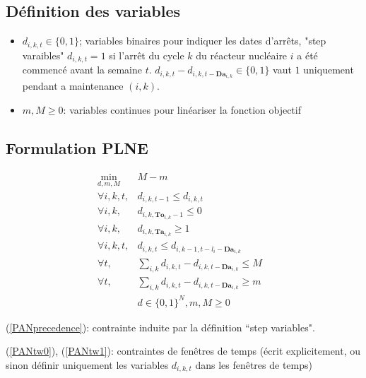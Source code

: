 \documentclass[a4paper,11pt]{article}
\begin{document}

    \subsection{Définition des variables}

    \begin{itemize}
     \item $d_{i,k,t}\in \{0,1\}$; variables binaires pour indiquer les dates d'arrêts, "step varaibles" 
    $d_{i,k,t}=1$ si l'arrêt du cycle $k$ du réacteur nucléaire $i$ a été commencé avant la semaine $t$.
    $d_{i,k,t}-d_{i,k,t- {\mathbf{Da}_{i,k}}} \in \{0,1\}$ vaut $1$ uniquement pendant a maintenance $(i,k)$.


     \item $m,M\geqslant 0$: variables continues pour linéariser la fonction objectif
    \end{itemize}


    \subsection{Formulation PLNE}


    \begin{eqnarray}
    \displaystyle \min_{d,m,M} & M-m
     & \\
    \forall i , k, t, & d_{i,k,t-1}\leqslant d_{i,k,t} & \label{PANprecedence}\\
    \forall i , k, & d_{i,k,\mathbf{To}_{i,k}-1}\leqslant 0 & \label{PANtw0} \\
    \forall i , k, & d_{i,k,\mathbf{Ta}_{i,k}}\geqslant 1 & \label{PANtw1}\\
    \forall i , k, t, & d_{i,k,t}\leqslant d_{i,k-1,t-l_i-\mathbf{Da}_{i,k}} & \label{PANprecedence2}\\
    \forall t, & \displaystyle \sum_{i,k} d_{i,k,t}-d_{i,k,t- {\mathbf{Da}_{i,k}}} \leqslant M & \label{maxMaint}\\
    \forall t, & \displaystyle \sum_{i,k} d_{i,k,t}-d_{i,k,t- {\mathbf{Da}_{i,k}}} \geqslant m & \label{minMaint}\\
    & d \in \{0,1\}^N, m,M \geqslant 0
    \end{eqnarray}

    (\ref{PANprecedence}): contrainte induite par la définition ``step variables".

    (\ref{PANtw0}), (\ref{PANtw1}): contraintes de fenêtres de temps (écrit explicitement, ou sinon définir uniquement les variables $d_{i,k,t}$
    dans les fenêtres de temps)
\end{document}
